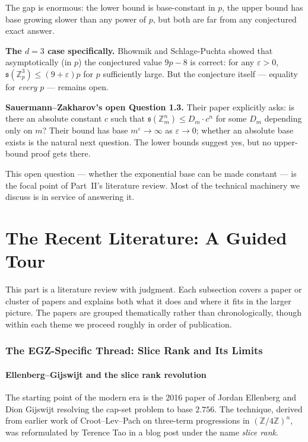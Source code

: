 \documentclass[11pt,a4paper]{article}
\theoremstyle{plain}
\theoremstyle{definition}
\theoremstyle{remark}
\newcommand{\Z}{\mathbb{Z}}
\newcommand{\sUFp}{\mathfrak{s}}
\begin{document}
The gap is enormous: the lower bound is base-constant in $p$, the upper bound has base growing slower than any power of $p$, but both are far from any conjectured exact answer.

\textbf{The $d = 3$ case specifically.} Bhowmik and Schlage-Puchta showed that asymptotically (in $p$) the conjectured value $9p - 8$ is correct: for any $\varepsilon > 0$, $\sUFp(\Z_p^3) \leq (9 + \varepsilon)p$ for $p$ sufficiently large. But the conjecture itself --- equality for \emph{every} $p$ --- remains open.

\textbf{Sauermann--Zakharov's open Question 1.3.} Their paper explicitly asks: is there an absolute constant $c$ such that $\sUFp(\Z_m^n) \leq D_m \cdot c^n$ for some $D_m$ depending only on $m$? Their bound has base $m^\varepsilon \to \infty$ as $\varepsilon \to 0$; whether an absolute base exists is the natural next question. The lower bounds suggest yes, but no upper-bound proof gets there.

This open question --- whether the exponential base can be made constant --- is the focal point of Part~II's literature review. Most of the technical machinery we discuss is in service of answering it.

\newpage

\part{The Recent Literature: A Guided Tour}

This part is a literature review with judgment. Each subsection covers a paper or cluster of papers and explains both what it does and where it fits in the larger picture. The papers are grouped thematically rather than chronologically, though within each theme we proceed roughly in order of publication.


\section{The EGZ-Specific Thread: Slice Rank and Its Limits}

\subsection{Ellenberg--Gijswijt and the slice rank revolution}

The starting point of the modern era is the 2016 paper of Jordan Ellenberg and Dion Gijswijt resolving the cap-set problem to base $2.756$. The technique, derived from earlier work of Croot--Lev--Pach on three-term progressions in $(\Z/4\Z)^n$, was reformulated by Terence Tao in a blog post under the name \emph{slice rank}.
\end{document}
